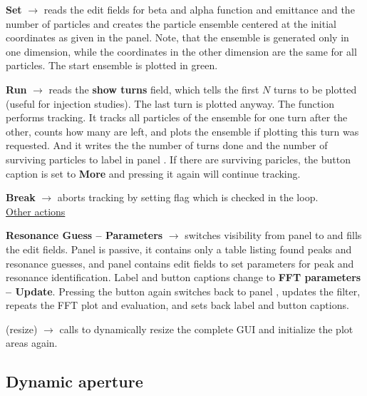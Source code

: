 \documentclass[12pt]{article}
\newcommand\code[1]{{\tt #1}}
\newcommand{\ofld}[1]{\colorbox{black!15}{{\bf #1}}}
\newcommand{\ofldx}[1]{\colorbox{black!15}{(#1)}}
\newcommand\guico[1]{{\color{blue}\code{#1}}}
\newcommand{\evcod}[2]{\ofld{#1} $\rightarrow$ \guico{#2}}
\newcommand{\evcodx}[2]{\ofldx{#1} $\rightarrow$ \guico{#2}}
\newcommand{\opagui}[1]{\colorbox{blue!20}{{\color{black}\code{#1}}}}
\newcommand{\oguih}[2]{\subsection{\label{#2}#1}{\Huge\opagui{#2}}\\}
\begin{document}
\evcod{Set}{ButBeamShowClick} reads the edit fields for beta and alpha function and emittance and the number of particles and creates the particle ensemble centered at the initial coordinates as given in the \guico{PanCtrl} panel. Note, that the ensemble is generated only in one dimension, while the coordinates in the other dimension are the same for all particles. The start ensemble is plotted in green.

\evcod{Run}{ButBeamRunClick} reads the \ofld{show turns} field, which tells the first $N$ turns to be plotted (useful for injection studies). The last turn is plotted anyway. The function \guico{TrackBeam} performs tracking. It tracks all particles of the ensemble for one turn after the other, counts how many are left, and plots the ensemble if plotting this turn was requested. And it writes the the number of turns done and the number of surviving particles to label \guico{LabT} in panel \guico{PanParam}. If there are surviving paricles, the button caption is set to \ofld{More} and pressing it again will continue tracking.

\evcod{Break}{ButBeamBreak} aborts tracking by setting flag \guico{BeamBreak} which is checked in the \guico{TrackBeam} loop.\\[1ex]

\underline{Other actions}

\evcod{Resonance Guess -- Parameters}{butParamClick} switches visibility from panel \guico{PanRes} to \guico{PanFFT} and fills the edit fields. Panel \guico{PanRes} is passive, it contains only a table listing found peaks and resonance guesses, and panel \guico{PanFFT} contains edit fields to set parameters for peak and resonance identification. Label and button captions change to \ofld{FFT parameters -- Update}. Pressing the button again switches back to panel \guico{PanRes}, updates the filter, repeats the FFT plot and evaluation, and sets back label and button captions.

\evcodx{resize}{FormResize} calls \guico{ResizeAll} to dynamically resize the complete GUI and initialize the plot areas again.





\oguih{Dynamic aperture}{opatrackda} 
\end{document}
